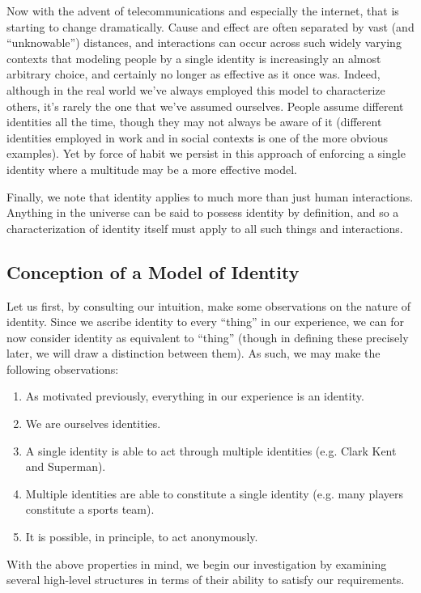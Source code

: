 \documentclass[pra,twocolumn,groupedaddress,10pt]{revtex4}
\theoremstyle{definition}
\begin{document}
Now with the advent of telecommunications and especially the internet, that is starting to change dramatically. Cause and effect are often separated by vast (and ``unknowable'') distances, and interactions can occur across such widely varying contexts that modeling people by a single identity is increasingly an almost arbitrary choice, and certainly no longer as effective as it once was. Indeed, although in the real world we've always employed this model to characterize others, it's rarely the one that we've assumed ourselves. People assume different identities all the time, though they may not always be aware of it (different identities employed in work and in social contexts is one of the more obvious examples). Yet by force of habit we persist in this approach of enforcing a single identity where a multitude may be a more effective model.

Finally, we note that identity applies to much more than just human interactions. Anything in the universe can be said to possess identity by definition, and so a characterization of identity itself must apply to all such things and interactions.

\subsection{Conception of a Model of Identity} \label{sec:conmodide}

Let us first, by consulting our intuition, make some observations on the nature of identity. Since we ascribe identity to every ``thing'' in our experience, we can for now consider identity as equivalent to ``thing'' (though in defining these precisely later, we will draw a distinction between them). As such, we may make the following observations:

\begin{enumerate}
	\item As motivated previously, everything in our experience is an identity.
	\item We are ourselves identities.
	\item A single identity is able to act through multiple identities (e.g. Clark Kent and Superman).
	\item Multiple identities are able to constitute a single identity (e.g. many players constitute a sports team).
	\item It is possible, in principle, to act anonymously.
\end{enumerate}

With the above properties in mind, we begin our investigation by examining several high-level structures in terms of their ability to satisfy our requirements.
\end{document}
